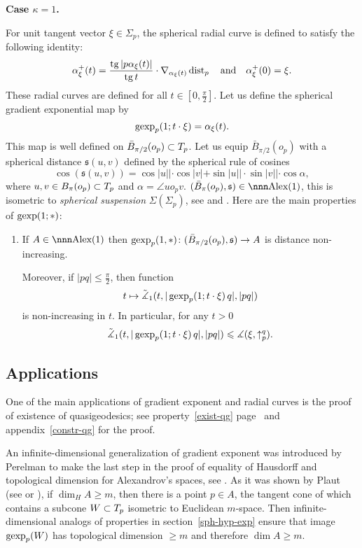 \documentclass{article}
\begin{document}
\begin{thm}\label{kappa=1}
{\bf Case $\kappa=1$.}
\end{thm}
For unit tangent vector $\xi\in \Sigma_p$, the spherical radial curve is defined to satisfy the
following identity:
$$\alpha^+_\xi(t)=\frac{\operatorname{tg}|p\alpha_\xi(t)|}{\operatorname{tg} t}\cdot\nabla_{\alpha_\xi(t)}\operatorname{dist}_p\ \ \ \text{and}\ \ \
\alpha^+_\xi(0)=\xi.$$
These radial curves are defined for all $t\in [0,\tfrac\pi2]$.
Let us define the spherical gradient exponential map by
$$\operatorname{gexp}_p(1;t\cdot \xi)=\alpha_\xi(t).$$
This map is well defined on $\bar B_{\pi/2}(o_p)\subset T_p$.
Let us equip $\bar B_{\pi/2}(o_p)$ with a spherical distance $\mathfrak{s}(u,v)$ defined by
the spherical rule of cosines
$$\cos(\mathfrak{s}(u,v)) 
=
\cos|u||\cdot\cos|v|+\sin|u||\cdot\sin|v||\cdot\cos\alpha,$$
where $u,v\in B_\pi(o_p)\subset T_p$ and $\alpha=\angle u o_p v$.
$(\bar B_{\pi}(o_p),\mathfrak{s})\in\Alex(1)$, this is isometric to \emph{spherical suspension} $\Sigma(\Sigma_p)$, see \cite[4.3.1]{BGP} and \cite{alexander-bishop:worps}.
Here are the main properties of $\operatorname{gexp}(1;*)$:
\begin{enumerate}[$\diamond$]
\item If $A\in\Alex(1)$ then $\operatorname{gexp}_p(1,*)\colon(\bar B_{\pi/2}(o_p),\mathfrak{s})\to
A$ is distance non-increasing.

Moreover, if $|p q|\le\tfrac\pi2$, then function
$$t\mapsto\tilde{\measuredangle}_{1}(t,|\operatorname{gexp}_p(1;t\cdot \xi)\,q|,|p q|)$$ 
is non-increasing in $t$. 
In particular, for any $t>0$
$$\tilde{\measuredangle}_{1}(t,|\operatorname{gexp}_p(1;t\cdot \xi)\,q|,|p
q|)\leqslant\measuredangle(\xi,\uparrow_p^q).$$
\end{enumerate}






\subsection{Applications}

One of the main applications of gradient exponent and radial curves is the proof
of existence of quasigeodesics; 
see property~\ref{exist-qg} page~\pageref{exist-qg} and appendix~\ref{constr-qg} for the proof.

An infinite-dimensional generalization of gradient exponent was introduced by Perelman to make the last step in the proof of equality of Hausdorff and topological dimension for Alexandrov's spaces, 
see \cite[A.4]{perelman-petrunin:qg}.
As it was shown by Plaut (see \cite{plaut:dimension} or
\cite[151]{plaut:survey}), 
if $\dim_H A\ge m$, then there is a point $p\in A$, the tangent cone of which contains a subcone $W\subset T_p$ isometric to Euclidean $m$-space.
Then infinite-dimensional analogs of properties  in section~\ref{sph-hyp-exp} ensure that image $\operatorname{gexp}_p (W)$ has topological dimension $\ge m$ and therefore $\dim A\ge m$.
\end{document}
